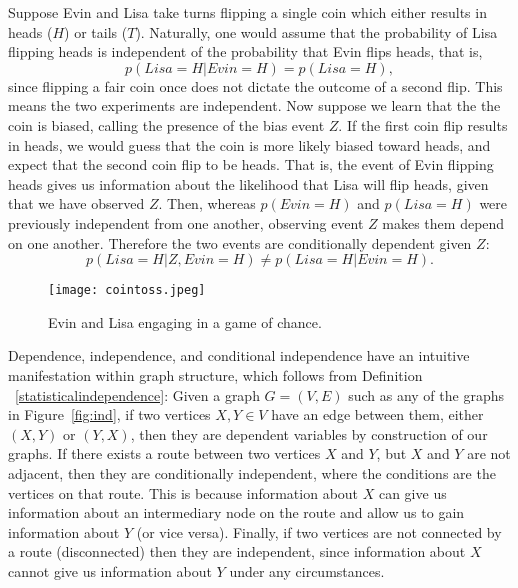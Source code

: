 \begin{example} Suppose Evin and Lisa take turns flipping a single coin which either results in heads ($H$) or tails ($T$). Naturally, one would assume that the probability of Lisa flipping heads is independent of the probability that Evin flips heads, that is, $$p(Lisa = H|Evin = H) = p(Lisa = H),$$ since flipping a fair coin once does not dictate the outcome of a second flip. This means the two experiments are independent.\newline
\null \quad \quad Now suppose we learn that the the coin is biased, calling the presence of the bias event $Z$. If the first coin flip results in heads, we would guess that the coin is more likely biased toward heads, and expect that the second coin flip to be heads. That is, the event of Evin flipping heads gives us information about the likelihood that Lisa will flip heads, given that we have observed $Z$. Then, whereas $p(Evin=H)$ and $p(Lisa=H)$ were previously independent from one another, observing event $Z$ makes them depend on one another. Therefore the two events are conditionally dependent given $Z$:
$$p(Lisa=H|Z,Evin=H) \neq p(Lisa=H|Evin=H).$$ 

\begin{center}
\begin{figure}[h!]
\begin{center}
\centering
\texttt{[image: cointoss.jpeg]}
\caption{Evin and Lisa engaging in a game of chance.}
\end{center}
\end{figure}
\end{center}

\end{example} 
\null \quad \quad Dependence, independence, and conditional independence have an intuitive manifestation within graph structure, which follows from Definition ~\ref{statisticalindependence}: \newline
\null \quad \quad Given a graph $G=(V,E)$ such as any of the graphs in Figure~\ref{fig:ind}, if two vertices $X, Y \in V$ have an edge between them, either $(X,Y)$ or $(Y,X)$, then they are dependent variables by construction of our graphs. \newline
\null \quad \quad If there exists a route between two vertices $X$ and $Y$, but $X$ and $Y$ are not adjacent, then they are conditionally independent, where the conditions are the vertices on that route. This is because information about $X$ can give us information about an intermediary node on the route and allow us to gain information about $Y$ (or vice versa). \newline
\null \quad \quad Finally, if two vertices are not connected by a route (disconnected) then they are independent, since information about $X$ cannot give us information about $Y$ under any circumstances. \\[2em]


